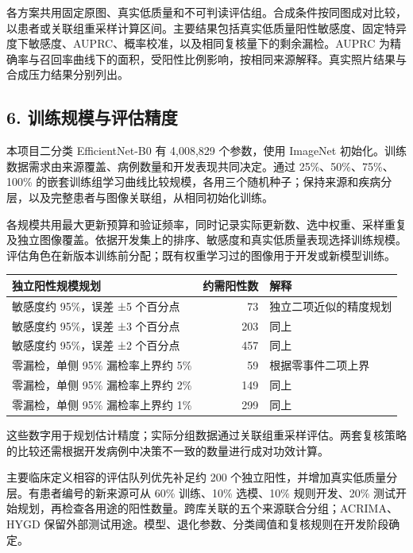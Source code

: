 \documentclass[
  10pt,
]{article}
\begin{document}
各方案共用固定原图、真实低质量和不可判读评估组。合成条件按同图成对比较，以患者或关联组重采样计算区间。主要结果包括真实低质量阳性敏感度、固定特异度下敏感度、AUPRC、概率校准，以及相同复核量下的剩余漏检。AUPRC
为精确率与召回率曲线下的面积，受阳性比例影响，按相同来源解释。真实照片结果与合成压力结果分别列出。

\subsection{6.
训练规模与评估精度}\label{ux8badux7ec3ux89c4ux6a21ux4e0eux8bc4ux4f30ux7cbeux5ea6}

本项目二分类 EfficientNet-B0 有 4,008,829 个参数，使用 ImageNet
初始化。训练数据需求由来源覆盖、病例数量和开发表现共同决定。通过
25\%、50\%、75\%、100\%
的嵌套训练组学习曲线比较规模，各用三个随机种子；保持来源和疾病分层，以及完整患者与图像关联组，从相同初始化训练。

各规模共用最大更新预算和验证频率，同时记录实际更新数、选中权重、采样重复及独立图像覆盖。依据开发集上的排序、敏感度和真实低质量表现选择训练规模。评估角色在新版本训练前分配；既有权重学习过的图像用于开发或新模型训练。

\begin{longtable}[]{@{}lrl@{}}
\toprule\noalign{}
独立阳性规模规划 & 约需阳性数 & 解释 \\
\midrule\noalign{}
\endhead
\bottomrule\noalign{}
\endlastfoot
敏感度约 95\%，误差 ±5 个百分点 & 73 & 独立二项近似的精度规划 \\
敏感度约 95\%，误差 ±3 个百分点 & 203 & 同上 \\
敏感度约 95\%，误差 ±2 个百分点 & 457 & 同上 \\
零漏检，单侧 95\% 漏检率上界约 5\% & 59 & 根据零事件二项上界 \\
零漏检，单侧 95\% 漏检率上界约 2\% & 149 & 同上 \\
零漏检，单侧 95\% 漏检率上界约 1\% & 299 & 同上 \\
\end{longtable}

这些数字用于规划估计精度；实际分组数据通过关联组重采样评估。两套复核策略的比较还需根据开发病例中决策不一致的数量进行成对功效计算。

主要临床定义相容的评估队列优先补足约 200
个独立阳性，并增加真实低质量分层。有患者编号的新来源可从 60\% 训练、10\%
选模、10\% 规则开发、20\%
测试开始规划，再检查各用途的阳性数量。跨库关联的五个来源联合分组；ACRIMA、HYGD
保留外部测试用途。模型、退化参数、分类阈值和复核规则在开发阶段确定。
\end{document}
